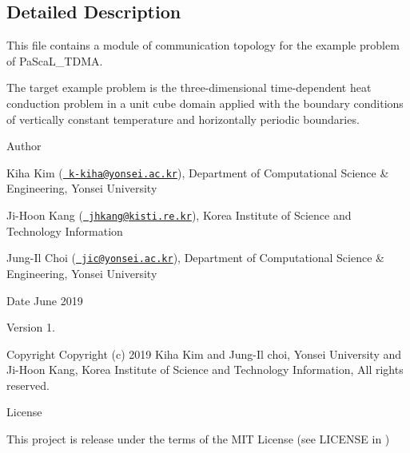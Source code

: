\subsection{Detailed Description}
This file contains a module of communication topology for the example problem of Pa\+Sca\+L\+\_\+\+T\+D\+MA. 

The target example problem is the three-\/dimensional time-\/dependent heat conduction problem in a unit cube domain applied with the boundary conditions of vertically constant temperature and horizontally periodic boundaries. \begin{DoxyAuthor}{Author}

\end{DoxyAuthor}

\begin{DoxyItemize}
\item Kiha Kim (\href{mailto:k-kiha@yonsei.ac.kr}{\texttt{ k-\/kiha@yonsei.\+ac.\+kr}}), Department of Computational Science \& Engineering, Yonsei University
\item Ji-\/\+Hoon Kang (\href{mailto:jhkang@kisti.re.kr}{\texttt{ jhkang@kisti.\+re.\+kr}}), Korea Institute of Science and Technology Information
\item Jung-\/\+Il Choi (\href{mailto:jic@yonsei.ac.kr}{\texttt{ jic@yonsei.\+ac.\+kr}}), Department of Computational Science \& Engineering, Yonsei University
\end{DoxyItemize}

\begin{DoxyDate}{Date}
June 2019 
\end{DoxyDate}
\begin{DoxyVersion}{Version}
1. 
\end{DoxyVersion}
\begin{DoxyParagraph}{Copyright}
Copyright (c) 2019 Kiha Kim and Jung-\/\+Il choi, Yonsei University and Ji-\/\+Hoon Kang, Korea Institute of Science and Technology Information, All rights reserved. 
\end{DoxyParagraph}
\begin{DoxyParagraph}{License }

\end{DoxyParagraph}
This project is release under the terms of the M\+IT License (see L\+I\+C\+E\+N\+SE in ) 